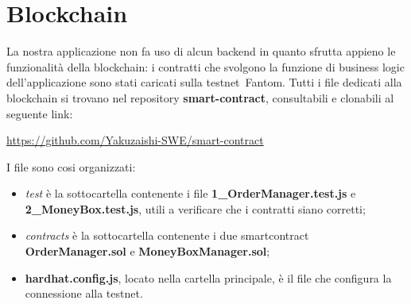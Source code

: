 \section{Blockchain}\label{section:blockchain}

La nostra applicazione non fa uso di alcun backend in quanto sfrutta appieno le funzionalità della blockchain: 
i contratti che svolgono la funzione di business logic dell'applicazione sono stati caricati sulla testnet\glo\ Fantom.
Tutti i file dedicati alla blockchain si trovano nel repository \textbf{smart-contract}, consultabili e clonabili al seguente link:

\begin{center}
    \href{https://github.com/Yakuzaishi-SWE/smart-contract}{https://github.com/Yakuzaishi-SWE/smart-contract}
\end{center}

I file sono cosi organizzati:
\begin{itemize}
    \item \textit{test} è la sottocartella contenente i file \textbf{1\_OrderManager.test.js} e \textbf{2\_MoneyBox.test.js}, utili a verificare che i contratti siano corretti;
    \item \textit{contracts} è la sottocartella contenente i due smartcontract \textbf{OrderManager.sol} e \textbf{MoneyBoxManager.sol};
    \item \textbf{hardhat.config.js}, locato nella cartella principale, è il file che configura la connessione alla testnet.
\end{itemize}


